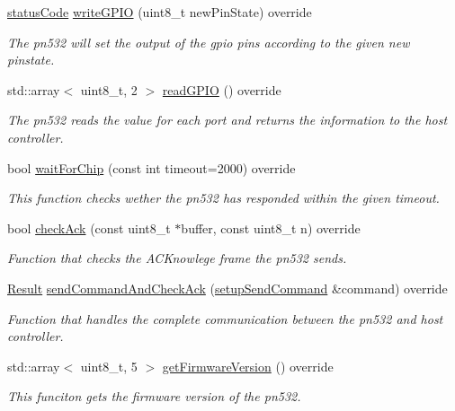 \begin{DoxyCompactItemize}
\hyperlink{declarations_8h_ae1d20c5a38cae82ccaa6a77be3fd264b}{status\+Code} \hyperlink{classnfc_1_1PN532__chip_ad33f6bf96640bf7b10407e735ca57e2a}{write\+G\+P\+IO} (uint8\+\_\+t new\+Pin\+State) override
\begin{DoxyCompactList}\small\item\em The pn532 will set the output of the gpio pins according to the given new pinstate. \end{DoxyCompactList}\item 
std\+::array$<$ uint8\+\_\+t, 2 $>$ \hyperlink{classnfc_1_1PN532__chip_a1c7e2ace0798d1e6b11bbab4a5e632c5}{read\+G\+P\+IO} () override
\begin{DoxyCompactList}\small\item\em The pn532 reads the value for each port and returns the information to the host controller. \end{DoxyCompactList}\item 
bool \hyperlink{classnfc_1_1PN532__chip_a10aa275adf2ddbcb6db5afa5666a9594}{wait\+For\+Chip} (const int timeout=2000) override
\begin{DoxyCompactList}\small\item\em This function checks wether the pn532 has responded within the given timeout. \end{DoxyCompactList}\item 
bool \hyperlink{classnfc_1_1PN532__chip_a631fa2690b45119c7bbb99e07f41b464}{check\+Ack} (const uint8\+\_\+t $\ast$buffer, const uint8\+\_\+t n) override
\begin{DoxyCompactList}\small\item\em Function that checks the A\+C\+Knowlege frame the pn532 sends. \end{DoxyCompactList}\item 
\hyperlink{structnfc_1_1Result}{Result} \hyperlink{classnfc_1_1PN532__chip_a3184528f3e8e793905d1638067cfe9e1}{send\+Command\+And\+Check\+Ack} (\hyperlink{classsetupSendCommand}{setup\+Send\+Command} \&command) override
\begin{DoxyCompactList}\small\item\em Function that handles the complete communication between the pn532 and host controller. \end{DoxyCompactList}\item 
std\+::array$<$ uint8\+\_\+t, 5 $>$ \hyperlink{classnfc_1_1PN532__chip_a00764b6b9472c89430bb1503ec1bf08b}{get\+Firmware\+Version} () override
\begin{DoxyCompactList}\small\item\em This funciton gets the firmware version of the pn532. \end{DoxyCompactList}\item 

\end{DoxyCompactItemize}
